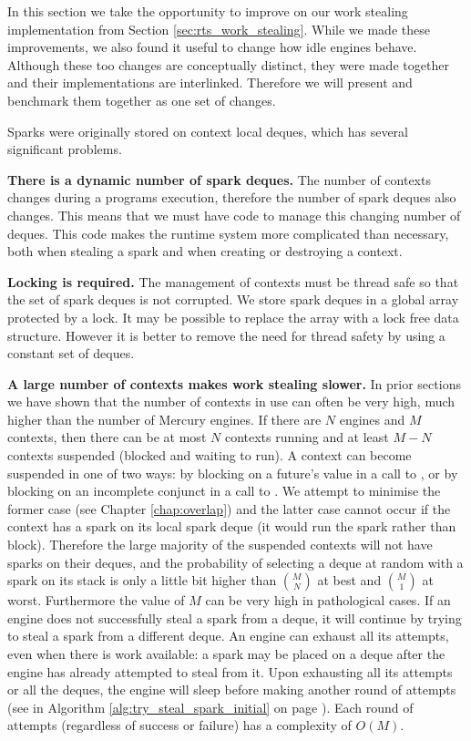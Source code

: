 

In this section we take the opportunity to improve on our work stealing
implementation from Section \ref{sec:rts_work_stealing}.
While we made these improvements,
we also found it useful to change how idle engines behave.
Although these too changes are conceptually distinct,
they were made together and their implementations are interlinked.
Therefore we will present and benchmark them together as one set of changes.

Sparks were originally stored on context local deques,
which has several significant problems.

\textbf{There is a dynamic number of spark deques.}
The number of contexts changes during a programs execution,
therefore the number of spark deques also changes.
This means that we must have code to manage this changing number of
deques.
This code makes the runtime system more complicated than necessary,
both when stealing a spark and when creating or destroying a context.

\textbf{Locking is required.}
The management of contexts must be thread safe so that the set of
spark deques is not corrupted.
We store spark deques in a global array protected by a lock.
It may be possible to replace the array with a lock free data structure.
However it is better to remove the need for thread safety by using a
constant set of deques.

\textbf{A large number of contexts makes work stealing slower.}
In prior sections
we have shown that the number of contexts in use can often be very high,
much higher than the number of Mercury engines.
If there are $N$ engines and $M$ contexts,
then there can be at most $N$ contexts running and
at least $M-N$ contexts suspended (blocked and waiting to run).
A context can become suspended in one of two ways:
by blocking on a future's value in a call to \wait,
or by blocking on an incomplete conjunct in a call to \joinandcontinue.
We attempt to minimise the former case (see Chapter \ref{chap:overlap})
and the latter case cannot occur
if the context has a spark on its local spark deque (it would run the
spark rather than block).
Therefore the large majority of the suspended contexts will not have
sparks on their deques,
and the probability of selecting a deque at random with a spark on its
stack is only a little bit higher than $M \choose N$ at best and
$M \choose 1$ at worst.
Furthermore the value of $M$ can be very high in pathological cases.
If an engine does not successfully steal a spark from a deque,
it will continue by trying to steal a spark from a different deque.
An engine can exhaust all its attempts, even when there is work
available:
a spark may be placed on a deque after the engine has already attempted
to steal from it.
Upon exhausting all its attempts or all the deques,
the engine will sleep before making another round of attempts
(see \trystealspark in Algorithm \ref{alg:try_steal_spark_initial} on 
page \pageref{alg:try_steal_spark_initial}).
Each round of attempts (regardless of success or failure) has a
complexity of $O(M)$.

